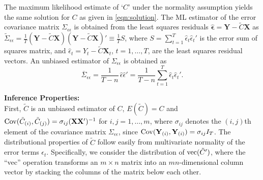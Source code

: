 The maximum likelihood estimate of `$C$' under the normality assumption yields the same solution for $C$ as given in \eqref{eqn:solution}. The ML estimator of the error covariance matrix $\Sigma_{\epsilon\epsilon}$ is obtained from the least squares residuals $\hat{\mathbf{\epsilon}}= \mathbf{Y} - \tilde{C} \mathbf{X}$ as $\tilde{\Sigma}_{\epsilon\epsilon}= \frac{1}{T}(\mathbf{Y} - \tilde{C}\mathbf{X})(\mathbf{Y} - \tilde{C} \mathbf{X})' \equiv \frac{1}{T}S$, where $S= \sum_{t=1}^T \hat{\epsilon}_t \hat{\epsilon}_t'$ is the error sum of squares matrix, and $\hat{\epsilon}_t= Y_t - \tilde{C} \mathbf{X}_t$, $t=1,\ldots,T$, are the least squares residual vectors. An unbiased estimator of $\Sigma_{\epsilon\epsilon}$ is obtained as 
	\begin{equation} \label{eqn:5unbiased}
	\overline{\Sigma}_{\epsilon\epsilon} = \dfrac{1}{T-n} \,\hat{\epsilon} \hat{\epsilon}' = \dfrac{1}{T-n} \sum_{t=1}^T \hat{\epsilon}_t \hat{\epsilon}_t'.
	\end{equation}


\noindent\textbf{Inference Properties:} \\


First, $\tilde{C}$ is an unbiased estimator of $C$, $E(\tilde{C})= C$ and $\operatorname{Cov}(\tilde{C}_{(i)}, \tilde{C}_{(j)})= \sigma_{ij} (\mathbf{X}\mathbf{X}')^{-1}$ for $i,j= 1,\ldots, m$, where $\sigma_{ij}$ denotes the $(i,j)$th element of the covariance matrix $\Sigma_{\epsilon\epsilon}$, since $\operatorname{Cov}(\mathbf{Y}_{(i)}, \mathbf{Y}_{(i)})= \sigma_{ij} I_T$. The distributional properties of $\tilde{C}$ follow easily from multivariate normality of the error terms $\epsilon_t$. Specifically, we consider the distribution of $\operatorname{vec}(\tilde{C}')$, where the ``vec'' operation transforms an $m \times n$ matrix into an $mn$-dimensional column vector by stacking the columns of the matrix below each other. 


